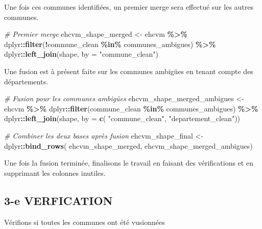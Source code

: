 \documentclass[
]{article}
\newenvironment{Shaded}{\begin{snugshade}}{\end{snugshade}}
\newcommand{\AttributeTok}[1]{\textcolor[rgb]{0.13,0.29,0.53}{#1}}
\newcommand{\CommentTok}[1]{\textcolor[rgb]{0.56,0.35,0.01}{\textit{#1}}}
\newcommand{\FunctionTok}[1]{\textcolor[rgb]{0.13,0.29,0.53}{\textbf{#1}}}
\newcommand{\NormalTok}[1]{#1}
\newcommand{\OtherTok}[1]{\textcolor[rgb]{0.56,0.35,0.01}{#1}}
\newcommand{\SpecialCharTok}[1]{\textcolor[rgb]{0.81,0.36,0.00}{\textbf{#1}}}
\newcommand{\StringTok}[1]{\textcolor[rgb]{0.31,0.60,0.02}{#1}}
\begin{document}
Une fois ces communes identifiées, un premier merge sera effectué sur
les autres communes.

\begin{Shaded}
\begin{Highlighting}[]
\CommentTok{\# Premier merge}
\NormalTok{ehcvm\_shape\_merged }\OtherTok{\textless{}{-}}\NormalTok{ ehcvm }\SpecialCharTok{\%\textgreater{}\%}
\NormalTok{  dplyr}\SpecialCharTok{::}\FunctionTok{filter}\NormalTok{(}\SpecialCharTok{!}\NormalTok{commune\_clean }\SpecialCharTok{\%in\%}\NormalTok{ communes\_ambigues) }\SpecialCharTok{\%\textgreater{}\%}
\NormalTok{  dplyr}\SpecialCharTok{::}\FunctionTok{left\_join}\NormalTok{(shape, }\AttributeTok{by =} \StringTok{"commune\_clean"}\NormalTok{)}
\end{Highlighting}
\end{Shaded}

Une fusion est à présent faite sur les communes ambigües en tenant
compte des départements.

\begin{Shaded}
\begin{Highlighting}[]
\CommentTok{\# Fusion pour les communes ambigües}
\NormalTok{ehcvm\_shape\_merged\_ambigues }\OtherTok{\textless{}{-}}\NormalTok{ ehcvm }\SpecialCharTok{\%\textgreater{}\%}
\NormalTok{  dplyr}\SpecialCharTok{::}\FunctionTok{filter}\NormalTok{(commune\_clean }\SpecialCharTok{\%in\%}\NormalTok{ communes\_ambigues) }\SpecialCharTok{\%\textgreater{}\%}
\NormalTok{  dplyr}\SpecialCharTok{::}\FunctionTok{left\_join}\NormalTok{(shape, }\AttributeTok{by =} \FunctionTok{c}\NormalTok{(}
    \StringTok{"commune\_clean"}\NormalTok{, }\StringTok{"departement\_clean"}\NormalTok{))}

\CommentTok{\# Combiner les deux bases après fusion}
\NormalTok{ehcvm\_shape\_final }\OtherTok{\textless{}{-}}\NormalTok{ dplyr}\SpecialCharTok{::}\FunctionTok{bind\_rows}\NormalTok{(}
\NormalTok{  ehcvm\_shape\_merged, ehcvm\_shape\_merged\_ambigues)}
\end{Highlighting}
\end{Shaded}

Une fois la fusion terminée, finalisons le travail en faisant des
vérifications et en supprimant les colonnes inutiles.

\subsection{3-e VERFICATION}\label{e-verfication}

Vérifions si toutes les communes ont été vusionnées
\end{document}
